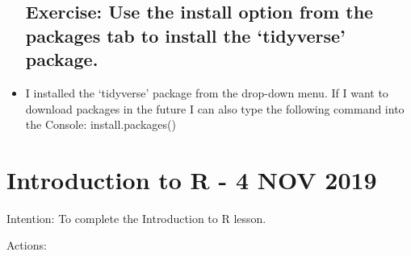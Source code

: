 \documentclass{article}
\begin{document}
\begin{itemize}
\subsection{Exercise: Use the install option from the packages tab to install the ‘tidyverse’ package.}
\item I installed the `tidyverse' package from the drop-down menu. If I want to download packages in the future I can also type the following command into the Console: install.packages()

\end{itemize}

\section{Introduction to R - 4 NOV 2019}
Intention: To complete the Introduction to R lesson.

Actions:
\end{document}
